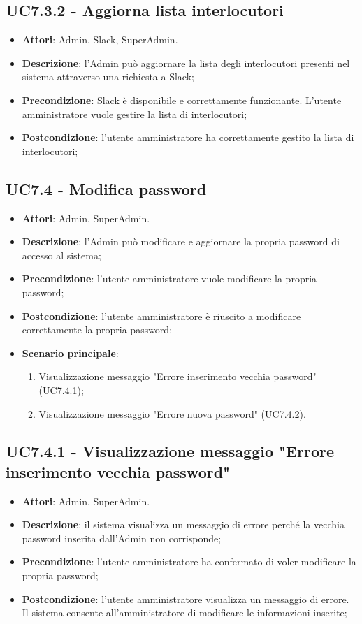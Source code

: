 \documentclass[../AnalisiDeiRequisiti.tex]{subfiles}
\begin{document}
\subsection{UC7.3.2 - Aggiorna lista interlocutori} 
\label{sssec:UC7.3.2} 
\begin{itemize} 
\item \textbf{Attori}: Admin, Slack, SuperAdmin.
\item \textbf{Descrizione}: l'Admin può aggiornare la lista degli interlocutori presenti nel sistema attraverso una richiesta a Slack;
\item \textbf{Precondizione}: Slack è disponibile e correttamente funzionante. L'utente amministratore vuole gestire la lista di interlocutori;
\item \textbf{Postcondizione}: l'utente amministratore ha correttamente gestito la lista di interlocutori;
\end{itemize} 
\subsection{UC7.4 - Modifica password} 
\label{sssec:UC7.4} 
\begin{itemize} 
\item \textbf{Attori}: Admin, SuperAdmin.
\item \textbf{Descrizione}: l'Admin può modificare e aggiornare la propria password di accesso al sistema;
\item \textbf{Precondizione}: l'utente amministratore vuole modificare la propria password;
\item \textbf{Postcondizione}: l'utente amministratore è riuscito a modificare correttamente la propria password;
\item \textbf{Scenario principale}: \begin{enumerate}\item Visualizzazione messaggio "Errore inserimento vecchia password" (UC7.4.1);\item Visualizzazione messaggio "Errore nuova password" (UC7.4.2). 
 \end{enumerate}
\end{itemize} 
\subsection{UC7.4.1 - Visualizzazione messaggio "Errore inserimento vecchia password"} 
\label{sssec:UC7.4.1} 
\begin{itemize} 
\item \textbf{Attori}: Admin, SuperAdmin.
\item \textbf{Descrizione}: il sistema visualizza un messaggio di errore perché la vecchia password inserita dall'Admin non corrisponde;
\item \textbf{Precondizione}: l'utente amministratore ha confermato di voler modificare la propria password;
\item \textbf{Postcondizione}: l'utente amministratore visualizza un messaggio di errore. Il sistema consente all'amministratore di modificare le informazioni inserite;
\end{itemize} 
\end{document}

